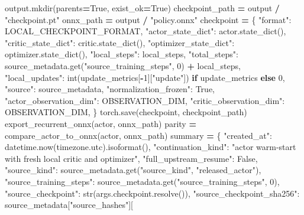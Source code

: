 \documentclass[
  chinese,
  11pt,
  letterpaper,
]{article}
\newenvironment{Shaded}{\begin{snugshade}}{\end{snugshade}}
\newcommand{\BuiltInTok}[1]{#1}
\newcommand{\ControlFlowTok}[1]{\textcolor[rgb]{0.13,0.29,0.53}{\textbf{#1}}}
\newcommand{\DecValTok}[1]{\textcolor[rgb]{0.00,0.00,0.81}{#1}}
\newcommand{\NormalTok}[1]{#1}
\newcommand{\OperatorTok}[1]{\textcolor[rgb]{0.81,0.36,0.00}{\textbf{#1}}}
\newcommand{\StringTok}[1]{\textcolor[rgb]{0.31,0.60,0.02}{#1}}
\newcommand{\VariableTok}[1]{\textcolor[rgb]{0.00,0.00,0.00}{#1}}
\renewenvironment{Shaded}{\par\smallskip}{\par\smallskip}
\begin{document}
\begin{Shaded}
\begin{Highlighting}[]
\NormalTok{    output.mkdir(parents}\OperatorTok{=}\VariableTok{True}\NormalTok{, exist\_ok}\OperatorTok{=}\VariableTok{True}\NormalTok{)}
\NormalTok{    checkpoint\_path }\OperatorTok{=}\NormalTok{ output }\OperatorTok{/} \StringTok{"checkpoint.pt"}
\NormalTok{    onnx\_path }\OperatorTok{=}\NormalTok{ output }\OperatorTok{/} \StringTok{"policy.onnx"}
\NormalTok{    checkpoint }\OperatorTok{=}\NormalTok{ \{}
        \StringTok{"format"}\NormalTok{: LOCAL\_CHECKPOINT\_FORMAT,}
        \StringTok{"actor\_state\_dict"}\NormalTok{: actor.state\_dict(),}
        \StringTok{"critic\_state\_dict"}\NormalTok{: critic.state\_dict(),}
        \StringTok{"optimizer\_state\_dict"}\NormalTok{: optimizer.state\_dict(),}
        \StringTok{"local\_steps"}\NormalTok{: local\_steps,}
        \StringTok{"total\_steps"}\NormalTok{: source\_metadata.get(}\StringTok{"source\_training\_steps"}\NormalTok{, }\DecValTok{0}\NormalTok{) }\OperatorTok{+}\NormalTok{ local\_steps,}
        \StringTok{"local\_updates"}\NormalTok{: }\BuiltInTok{int}\NormalTok{(update\_metrics[}\OperatorTok{{-}}\DecValTok{1}\NormalTok{][}\StringTok{"update"}\NormalTok{]) }\ControlFlowTok{if}\NormalTok{ update\_metrics }\ControlFlowTok{else} \DecValTok{0}\NormalTok{,}
        \StringTok{"source"}\NormalTok{: source\_metadata,}
        \StringTok{"normalization\_frozen"}\NormalTok{: }\VariableTok{True}\NormalTok{,}
        \StringTok{"actor\_observation\_dim"}\NormalTok{: OBSERVATION\_DIM,}
        \StringTok{"critic\_observation\_dim"}\NormalTok{: OBSERVATION\_DIM,}
\NormalTok{    \}}
\NormalTok{    torch.save(checkpoint, checkpoint\_path)}
\NormalTok{    export\_recurrent\_onnx(actor, onnx\_path)}
\NormalTok{    parity }\OperatorTok{=}\NormalTok{ compare\_actor\_to\_onnx(actor, onnx\_path)}
\NormalTok{    summary }\OperatorTok{=}\NormalTok{ \{}
        \StringTok{"created\_at"}\NormalTok{: datetime.now(timezone.utc).isoformat(),}
        \StringTok{"continuation\_kind"}\NormalTok{: }\StringTok{"actor warm{-}start with fresh local critic and optimizer"}\NormalTok{,}
        \StringTok{"full\_upstream\_resume"}\NormalTok{: }\VariableTok{False}\NormalTok{,}
        \StringTok{"source\_kind"}\NormalTok{: source\_metadata.get(}\StringTok{"source\_kind"}\NormalTok{, }\StringTok{"released\_actor"}\NormalTok{),}
        \StringTok{"source\_training\_steps"}\NormalTok{: source\_metadata.get(}\StringTok{"source\_training\_steps"}\NormalTok{, }\DecValTok{0}\NormalTok{),}
        \StringTok{"source\_checkpoint"}\NormalTok{: }\BuiltInTok{str}\NormalTok{(args.checkpoint.resolve()),}
        \StringTok{"source\_checkpoint\_sha256"}\NormalTok{: source\_metadata[}\StringTok{"source\_hashes"}\NormalTok{][}

\end{Highlighting}
\end{Shaded}
\end{document}
